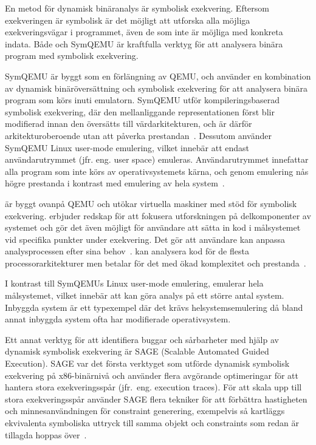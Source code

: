 En metod för dynamisk binäranalys är symbolisk exekvering. Eftersom exekveringen är symbolisk är
det möjligt att utforska alla möjliga exekveringsvägar i programmet, även de som inte är möjliga
med konkreta indata. Både \stoe{} och SymQEMU är kraftfulla verktyg för att analysera binära program
med symbolisk exekvering.

SymQEMU är byggt som en förlängning av QEMU, och använder en kombination av
dynamisk binäröversättning och symbolisk exekvering för att analysera binära
program som körs inuti emulatorn. SymQEMU utför kompileringsbaserad symbolisk
exekvering, där den mellanliggande representationen först blir modifierad innan
den översätts till värdarkitekturen, och är därför arkitekturoberoende utan att
påverka prestandan~\cite{symqemu}. Dessutom använder SymQEMU Linux user-mode
emulering, vilket innebär att endast användarutrymmet (jfr. eng. user space)
emuleras. Användarutrymmet innefattar alla program som inte körs av
operativsystemets kärna, och genom emulering nås högre prestanda i kontrast med
emulering av hela system~\cite{symqemu}.

\stoe{} är byggt ovanpå QEMU och utökar virtuella maskiner med stöd för
symbolisk exekvering. \stoe{} erbjuder redskap för att fokusera utforskningen på
delkomponenter av systemet och gör det även möjligt för användare att sätta in
kod i målsystemet vid specifika punkter under exekvering. Det gör att användare
kan anpassa analysprocessen efter sina behov~\cite{s2e}. \stoe{} kan analysera
kod för de flesta processorarkitekturer men betalar för det med ökad komplexitet
och prestanda~\cite{symqemu}.

I kontrast till SymQEMUs Linux user-mode emulering, emulerar \stoe{} hela
målsystemet, vilket innebär att \stoe{} kan göra analys på ett större antal
system. Inbyggda system är ett typexempel där det krävs helsystemsemulering då
bland annat inbyggda system ofta har modifierade operativsystem.

Ett annat verktyg för att identifiera buggar och sårbarheter med hjälp av dynamisk symbolisk
exekvering är SAGE (Scalable Automated Guided Execution).
SAGE var det första verktyget som utförde dynamisk symbolisk exekvering på x86-binärnivå och använder flera
avgörande optimeringar för att hantera stora exekveringsspår (jfr.\ eng. execution traces).
För att skala upp till stora exekveringsspår använder SAGE flera tekniker för att förbättra hastigheten och
minnesanvändningen för constraint generering, exempelvis så kartläggs ekvivalenta symboliska uttryck till samma
objekt och constraints som redan är tillagda hoppas över~\cite{sage}.

